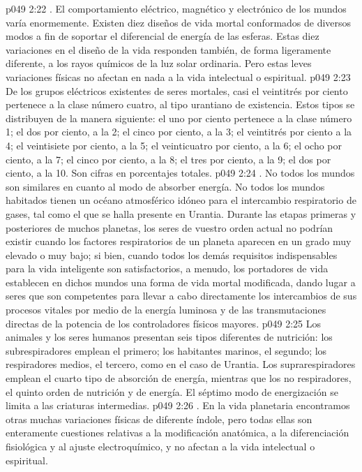 \vs p049 2:22 . El comportamiento eléctrico, magnético y electrónico de los mundos varía enormemente. Existen diez diseños de vida mortal conformados de diversos modos a fin de soportar el diferencial de energía de las esferas. Estas diez variaciones en el diseño de la vida responden también, de forma ligeramente diferente, a los rayos químicos de la luz solar ordinaria. Pero estas leves variaciones físicas no afectan en nada a la vida intelectual o espiritual.
\vs p049 2:23 De los grupos eléctricos existentes de seres mortales, casi el veintitrés por ciento pertenece a la clase número cuatro, al tipo urantiano de existencia. Estos tipos se distribuyen de la manera siguiente: el uno por ciento pertenece a la clase número 1; el dos por ciento, a la 2; el cinco por ciento, a la 3; el veintitrés por ciento a la 4; el veintisiete por ciento, a la 5; el veinticuatro por ciento, a la 6; el ocho por ciento, a la 7; el cinco por ciento, a la 8; el tres por ciento, a la 9; el dos por ciento, a la 10. Son cifras en porcentajes totales.
\vs p049 2:24 . No todos los mundos son similares en cuanto al modo de absorber energía. No todos los mundos habitados tienen un océano atmosférico idóneo para el intercambio respiratorio de gases, tal como el que se halla presente en Urantia. Durante las etapas primeras y posteriores de muchos planetas, los seres de vuestro orden actual no podrían existir cuando los factores respiratorios de un planeta aparecen en un grado muy elevado o muy bajo; si bien, cuando todos los demás requisitos indispensables para la vida inteligente son satisfactorios, a menudo, los portadores de vida establecen en dichos mundos una forma de vida mortal modificada, dando lugar a seres que son competentes para llevar a cabo directamente los intercambios de sus procesos vitales por medio de la energía luminosa y de las transmutaciones directas de la potencia de los controladores físicos mayores.
\vs p049 2:25 Los animales y los seres humanos presentan seis tipos diferentes de nutrición: los subrespiradores emplean el primero; los habitantes marinos, el segundo; los respiradores medios, el tercero, como en el caso de Urantia. Los suprarespiradores emplean el cuarto tipo de absorción de energía, mientras que los no respiradores, el quinto orden de nutrición y de energía. El séptimo modo de energización se limita a las criaturas intermedias.
\vs p049 2:26 . En la vida planetaria encontramos otras muchas variaciones físicas de diferente índole, pero todas ellas son enteramente cuestiones relativas a la modificación anatómica, a la diferenciación fisiológica y al ajuste electroquímico, y no afectan a la vida intelectual o espiritual.

